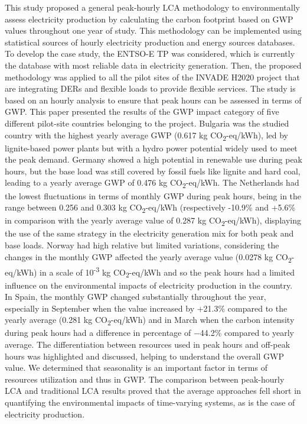 {{{{This study  proposed a general peak-hourly LCA methodology to environmentally assess electricity production by calculating the carbon footprint based on GWP values throughout one year of study. This methodology can be implemented using statistical sources of hourly electricity production and energy sources databases. To develop the case study, the ENTSO-E TP was considered, which is currently the database with most reliable data in electricity generation. Then, the proposed methodology was applied to all the pilot sites of the INVADE H2020 project that are integrating DERs and flexible loads to provide flexible services. The study is based on an hourly analysis to ensure that peak hours can be assessed in terms of GWP. 
This paper presented the results of the GWP impact category of five different pilot-site countries belonging to the project. Bulgaria was the studied country with the highest yearly average GWP (0.617 kg CO\textsubscript2-eq/kWh), led by lignite-based power plants but with a hydro power potential widely used to meet the peak demand. Germany showed a high potential in renewable use during peak hours, but the base load was still covered by fossil fuels like lignite and hard coal, leading to a yearly average GWP of 0.476 kg CO\textsubscript2-eq/kWh. The Netherlands had the lowest fluctuations in terms of monthly GWP during peak hours, being in the range between 0.256 and 0.303 kg CO\textsubscript2-eq/kWh (respectively -10.9\% and +5.6\% in comparison with the yearly average value of 0.287 kg CO\textsubscript2-eq/kWh), displaying the use of the same strategy in the electricity generation mix for both peak and base loads. Norway had high relative but limited variations, considering the changes in the monthly GWP affected the yearly average value (0.0278 kg CO\textsubscript2-eq/kWh) in a scale of 10\textsuperscript{-3} kg CO\textsubscript2-eq/kWh and so the peak hours had a limited influence on the environmental impacts of electricity production in the country. In Spain, the monthly GWP changed substantially throughout the year, especially in September when the value increased by +21.3\% compared to the yearly average (0.281 %
kg CO\textsubscript2-eq/kWh) and in March when the carbon intensity during peak hours had a difference in percentage of $-$44.2\% compared to yearly average. The differentiation between resources used in peak hours and off-peak hours was highlighted and discussed, helping to understand the overall GWP value. We determined that seasonality is an important factor in terms of resources utilization and thus in GWP. {The comparison between peak-hourly LCA and traditional LCA results proved that the average approaches fell short in quantifying the environmental impacts of time-varying systems, as is the case of electricity production.} 

}}}}
